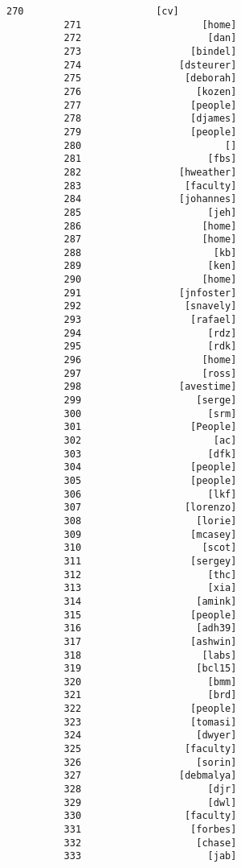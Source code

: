 \documentclass[11pt]{article}
\begin{document}
\begin{Verbatim}[commandchars=\\\{\}]
          270                       [cv]
          271                     [home]
          272                      [dan]
          273                   [bindel]
          274                 [dsteurer]
          275                  [deborah]
          276                    [kozen]
          277                   [people]
          278                   [djames]
          279                   [people]
          280                         []
          281                      [fbs]
          282                 [hweather]
          283                  [faculty]
          284                 [johannes]
          285                      [jeh]
          286                     [home]
          287                     [home]
          288                       [kb]
          289                      [ken]
          290                     [home]
          291                 [jnfoster]
          292                  [snavely]
          293                   [rafael]
          294                      [rdz]
          295                      [rdk]
          296                     [home]
          297                     [ross]
          298                 [avestime]
          299                    [serge]
          300                      [srm]
          301                   [People]
          302                       [ac]
          303                      [dfk]
          304                   [people]
          305                   [people]
          306                      [lkf]
          307                  [lorenzo]
          308                    [lorie]
          309                   [mcasey]
          310                     [scot]
          311                   [sergey]
          312                      [thc]
          313                      [xia]
          314                    [amink]
          315                   [people]
          316                    [adh39]
          317                   [ashwin]
          318                     [labs]
          319                    [bcl15]
          320                      [bmm]
          321                      [brd]
          322                   [people]
          323                   [tomasi]
          324                    [dwyer]
          325                  [faculty]
          326                    [sorin]
          327                 [debmalya]
          328                      [djr]
          329                      [dwl]
          330                  [faculty]
          331                   [forbes]
          332                    [chase]
          333                      [jab]

\end{Verbatim}
\end{document}

